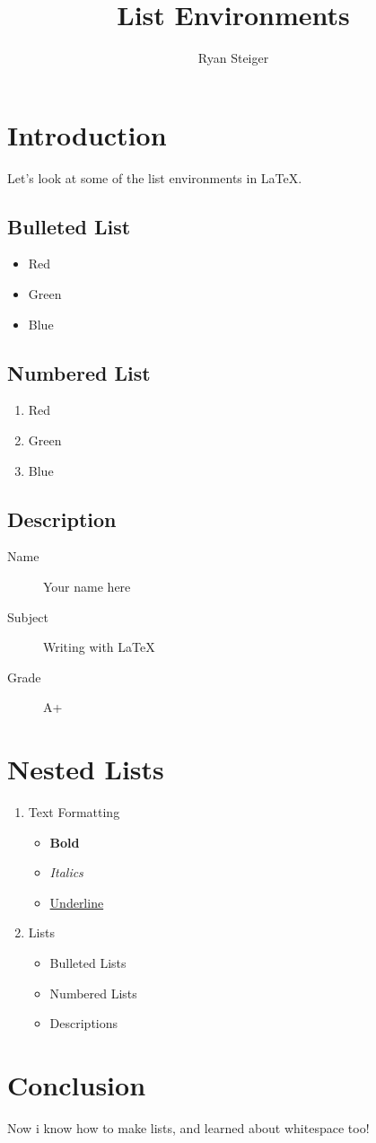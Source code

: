 \documentclass{article}
\title{List Environments}
\author{Ryan Steiger}
\date{}
\begin{document}
\maketitle

\section{Introduction}

Let's look at some of the list environments in \LaTeX.

\subsection{Bulleted List}

\begin{itemize}
  \item Red
  \item Green
  \item Blue
\end{itemize}

\subsection{Numbered List}

\begin{enumerate}
  \item Red
  \item Green
  \item Blue
\end{enumerate}

\subsection{Description}

\begin{description}
  \item[Name] Your name here
  \item[Subject] Writing with \LaTeX
  \item[Grade] A+   
\end{description}

\section{Nested Lists}

\begin{enumerate}
  \item Text Formatting
    \begin{itemize}
      \item \textbf{Bold}
      \item \emph{Italics}
      \item \underline{Underline}
    \end{itemize}
  \item Lists
    \begin{itemize}
      \item Bulleted Lists
      \item Numbered Lists
      \item Descriptions
    \end{itemize}
\end{enumerate}

\section{Conclusion}

Now i know how to make lists, and learned about whitespace too!
\end{document}
